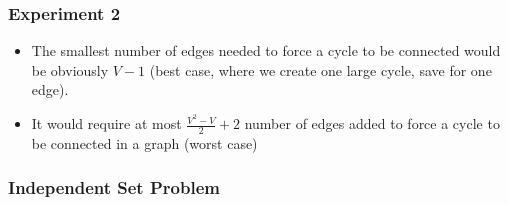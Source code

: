 \documentclass[12pt]{article}
\begin{document}
\subsubsection{Experiment 2}
\begin{itemize}
    \item The smallest number of edges needed to force a cycle to be connected would be obviously $V-1$ (best case, where we create one large cycle, save for one edge).
    \item It would require at most $\frac{V^2 - V}{2} + 2$ number of edges added to force a cycle to be connected in a graph (worst case) 
  \end{itemize}

\subsubsection{Independent Set Problem}
\end{document}
